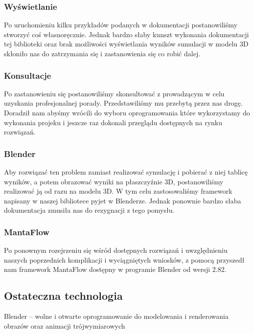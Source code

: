 \documentclass{article}
\begin{document}
            \medskip
            \subsubsection*{Wyświetlanie}
            \noindent Po uruchomieniu kilku przykładów podanych w dokumentacji postanowiliśmy stworzyć coś własnoręcznie. Jednak bardzo słaby kunszt wykonania dokumentacji tej biblioteki oraz brak możliwości wyświetlania wyników sumulacji w modelu 3D skłoniło nas  do zatrzymania się i zastanowienia się co robić dalej.
            
            \medskip
            \subsubsection*{Konsultacje}
            \noindent Po zastanowieniu się postanowiliśmy skonsultować z prowadzącym w celu uzyskania profesjonalnej porady. Przedstawiliśmy mu przebytą przez nas drogę. Doradził nam abyśmy wrócili do wyboru oprogramowania które wykorzystamy do wykonania projeku i jeszcze raz dokonali przeglądu dostępnych na rynku rozwiązań. 

            
            \medskip
            \subsubsection*{Blender}
            \noindent Aby rozwiązać ten problem zamiast realizować symulację i pobierać z niej tablicę wyników, a potem obrazować wyniki na płaszczyźnie 3D, postanowiliśmy realizować ją od razu na modelu 3D. W tym celu zastosowaliśmy framework napisany w naszej bibliotece pyjet w Blenderze. Jednak ponownie bardzo słaba dokumentacja zmusiła nas do rezygnacji z tego pomysłu.
        
            \medskip
            \subsubsection*{MantaFlow}
            \noindent Po ponownym rozejrzeniu się wśród dostępnych rozwiązań i uwzględnieniu naszych poprzednich komplikacji i wyciągniętych wniosków, z pomocą przyszedł nam framework MantaFlow dostępny w programie Blender od wersji 2.82. 
            
        \subsection{Ostateczna technologia}
            Blender – wolne i otwarte oprogramowanie do modelowania i renderowania obrazów oraz animacji trójwymiarowych
            
\end{document}
